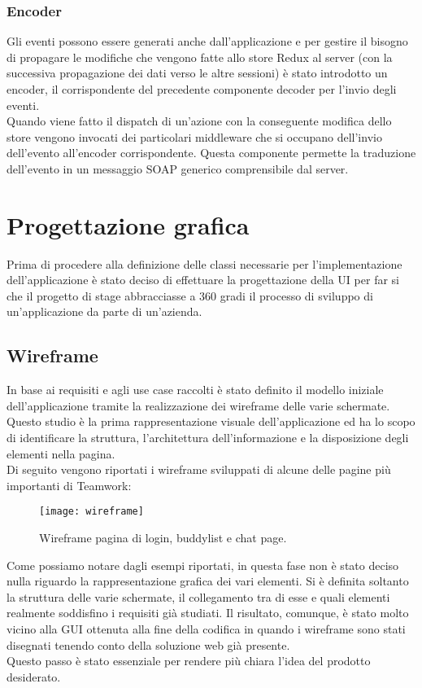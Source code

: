 \subsubsection{Encoder}
Gli eventi possono essere generati anche dall'applicazione e per gestire il bisogno di propagare le modifiche che vengono fatte allo store Redux al server (con la successiva propagazione dei dati verso le altre sessioni) è stato introdotto un encoder, il corrispondente del precedente componente decoder per l'invio degli eventi. \\
Quando viene fatto il dispatch di un'azione con la conseguente modifica dello store vengono invocati dei particolari middleware che si occupano dell'invio dell'evento all'encoder corrispondente. Questa componente permette la traduzione dell'evento in un messaggio SOAP generico comprensibile dal server.
\section{Progettazione grafica}
Prima di procedere alla definizione delle classi necessarie per l'implementazione 
dell'applicazione è stato deciso di effettuare la progettazione della UI per far 
si che il progetto di stage abbracciasse a 360 gradi il processo di sviluppo di 
un'applicazione da parte di un'azienda.

\subsection{Wireframe}
In base ai requisiti e agli use case raccolti è stato definito il modello iniziale
 dell'applicazione tramite la realizzazione dei wireframe delle varie schermate. \\
Questo studio è la prima rappresentazione visuale dell'applicazione ed ha lo 
scopo di identificare la struttura, l'architettura dell'informazione e la 
disposizione degli elementi nella pagina.\\
Di seguito vengono riportati i wireframe sviluppati di alcune delle pagine più 
importanti di Teamwork:
\begin{figure}[H] 
	\centering
	\texttt{[image: wireframe]}
	\caption{Wireframe pagina di login, buddylist e chat page.}
\end{figure}
Come possiamo notare dagli esempi riportati, in questa fase non è stato deciso 
nulla riguardo la rappresentazione grafica dei vari elementi. 
Si è definita soltanto la struttura delle varie schermate, il collegamento tra 
di esse e quali elementi realmente soddisfino i requisiti già studiati. 
Il risultato, comunque, è stato molto vicino alla GUI ottenuta alla fine della 
codifica in quando i wireframe sono stati disegnati tenendo conto della 
soluzione web già presente.\\ 
Questo passo è stato essenziale per rendere più chiara l'idea del prodotto desiderato.

